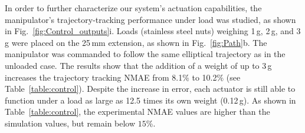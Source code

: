 In order to further characterize our system's actuation capabilities, the manipulator's trajectory-tracking performance under load was studied, as shown in Fig.~\ref{fig:Control_outputs}i. Loads (stainless steel nuts) weighing 1\,g, 2\,g, and 3\,g were placed on the 25\,mm extension, as shown in Fig.~\ref{fig:Path}b. The manipulator was commanded to follow the same elliptical trajectory as in the unloaded case. The results show that the addition of a weight of up to 3\,g increases the trajectory tracking NMAE from 8.1$\%$ to 10.2$\%$ (see Table~\ref{table:control}). Despite the increase in error, each actuator is still able to function under a load as large as 12.5 times its own weight (0.12\,g).
As shown in Table~\ref{table:control}, the experimental NMAE values are higher than the simulation values, but remain below $15$\%.


